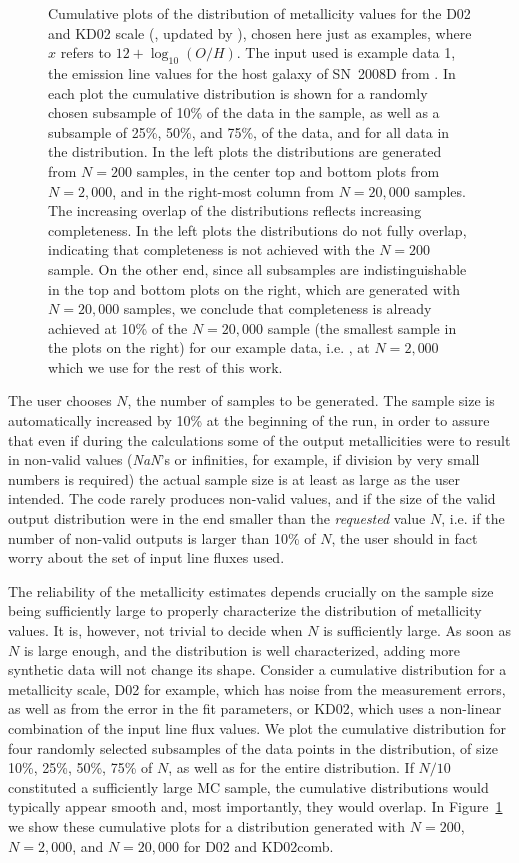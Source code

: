 \documentclass{emulateapj}
\newcommand{\oxabinline}{\ensuremath{12 + \log_{10}(O/H)}}
\begin{document}
\begin{figure}[!ht]
\caption{Cumulative plots of the distribution of metallicity values for the D02 \citep{denicolo02} and KD02 scale (\citealt{kewley02}, updated by \citealt{kewley08}), chosen here just as examples, where $x$ refers to \oxabinline. The input used is example data 1, the emission line values for the host galaxy of SN~2008D from \citet{modjaz11}. In each plot the cumulative distribution is shown for a randomly chosen subsample of 10\% of the data in the sample, as well as a subsample of 25\%, 50\%, and 75\%, of the data, and for all data in the distribution. In the left plots the distributions are generated from $N=200$ samples, in the center top and bottom plots from $N=2,000$,  and in the right-most column from $N=20,000$ samples. The increasing overlap of the distributions reflects increasing completeness. In the left plots the distributions do not fully overlap, indicating that completeness is not achieved with the $N=200$ sample. On the other end, since all subsamples are indistinguishable in the top and bottom plots on the right, which are generated with $N=20,000$ samples, we conclude that completeness is already achieved at 10\% of the $N=20,000$ sample (the smallest sample in the plots on the right) for our example data, i.e. , at $N=2,000$ which we use for the rest of this work.}
 \label{cd}
\end{figure}

The user chooses $N$, the number of samples to be generated. The sample size is  automatically increased by 10\% at the beginning of the run, in order to assure that even if during the calculations some of the output metallicities were to result in non-valid values (\emph{NaN}'s or infinities, for example, if division by very small numbers is required) the actual sample size is at least as large as the user intended. 
The code rarely produces non-valid values, and if the size of the valid output distribution were in the end smaller than the \emph{requested} value $N$, i.e. if the number of non-valid outputs is larger than 10\% of $N$, the user should in fact worry about the set of input line fluxes used. 

The reliability of the metallicity estimates depends crucially on the sample size being sufficiently large to properly characterize the distribution of metallicity values. It is, however, not trivial to decide when $N$ is sufficiently large. As soon as $N$ is large enough, and the distribution is well characterized, adding more synthetic data will not change its shape. Consider a cumulative distribution for a metallicity scale, D02 for example, which has noise from the measurement errors, as well as from the error in the fit parameters, or KD02, which uses a non-linear combination of the input line flux values. We plot the cumulative distribution for four randomly selected subsamples of the data points in the distribution, of size 10\%, 25\%, 50\%, 75\% of $N$, as well as for the entire distribution. If $N/10$ constituted a sufficiently large MC sample, the cumulative distributions would typically appear smooth and, most importantly, they would overlap. In Figure~\ref{cd} we show these cumulative plots for a distribution generated with $N=200$, $N=2,000$, and $N=20,000$ for D02 and KD02comb.
\end{document}
